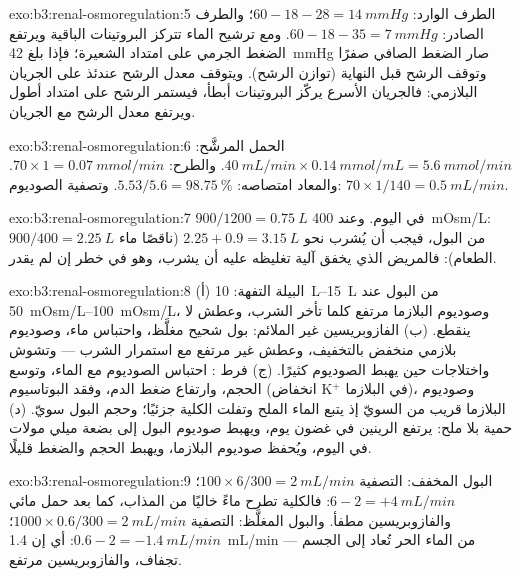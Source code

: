 \begin{solution}{exo:b3:renal-osmoregulation:5}
الطرف الوارد: $60 - 18 - 28 = \qty{14}{mmHg}$؛ والطرف الصادر: $60 - 18 -
35 = \qty{7}{mmHg}$. ومع ترشيح الماء تتركز البروتينات الباقية
ويرتفع الضغط الجرمي على امتداد الشعيرة؛ فإذا بلغ
\qty{42}{mmHg} صار الضغط الصافي صفرًا وتوقف الرشح قبل النهاية
(توازن الرشح). ويتوقف معدل الرشح عندئذ على الجريان البلازمي:
فالجريان الأسرع يركّز البروتينات أبطأ، فيستمر الرشح على
امتداد أطول ويرتفع معدل الرشح مع الجريان.
\end{solution}

\begin{solution}{exo:b3:renal-osmoregulation:6}
الحمل المرشَّح: $\qty{40}{mL/min}\times\qty{0.14}{mmol/mL} =
\qty{5.6}{mmol/min}$. والطرح: $70\times 1 = \qty{0.07}{mmol/min}$.
والمعاد امتصاصه: $5.53/5.6 = \qty{98.75}{\%}$. وتصفية الصوديوم: $70\times
1/140 = \qty{0.5}{mL/min}$.
\end{solution}

\begin{solution}{exo:b3:renal-osmoregulation:7}
$900/1200 = \qty{0.75}{L}$ في اليوم. وعند \qty{400}{mOsm/L}: $900/400 =
\qty{2.25}{L}$ من البول، فيجب أن يُشرب نحو $2.25 + 0.9 = \qty{3.15}{L}$
(ناقصًا ماء الطعام): فالمريض الذي يخفق آلية تغليظه عليه أن
يشرب، وهو في خطر إن لم يقدر.
\end{solution}

\begin{solution}{exo:b3:renal-osmoregulation:8}
(أ) البيلة التفهة: \qtyrange{10}{15}{L} من البول عند
\qtyrange{50}{100}{mOsm/L}، وصوديوم البلازما مرتفع كلما تأخر
الشرب، وعطش لا ينقطع. (ب) الفازوبريسين غير الملائم: بول شحيح
مغلَّظ، واحتباس ماء، وصوديوم بلازمي منخفض بالتخفيف، وعطش غير
مرتفع مع استمرار الشرب --- وتشوش واختلاجات حين يهبط الصوديوم
كثيرًا. (ج) فرط : احتباس الصوديوم مع الماء،
وتوسع الحجم، وارتفاع ضغط الدم، وفقد البوتاسيوم (انخفاض
K$^{+}$ في البلازما)، وصوديوم البلازما قريب من السويّ إذ يتبع
الماء الملح وتفلت الكلية جزئيًا؛ وحجم البول سويّ. (د) حمية
بلا ملح: يرتفع الرينين  في غضون يوم، ويهبط
صوديوم البول إلى بضعة ميلي مولات في اليوم، ويُحفظ صوديوم
البلازما، ويهبط الحجم والضغط قليلًا.
\end{solution}

\begin{solution}{exo:b3:renal-osmoregulation:9}
البول المخفف: التصفية  $100\times 6/300 = \qty{2}{mL/min}$؛
 $6 - 2 = +\qty{4}{mL/min}$: فالكلية تطرح
ماءً خاليًا من المذاب، كما بعد حمل مائي والفازوبريسين مطفأ.
والبول المغلَّظ: التصفية  $1000\times 0.6/300 =
\qty{2}{mL/min}$؛  $0.6 - 2 = -\qty{1.4}{mL/min}$:
أي إن \qty{1.4}{mL/min} من الماء الحر تُعاد إلى الجسم ---
تجفاف، والفازوبريسين مرتفع.
\end{solution}

